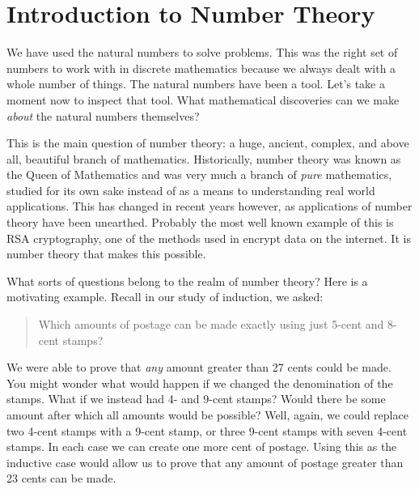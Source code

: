 \documentclass[10pt,]{book}
\theoremstyle{plain}
\theoremstyle{definition}
\theoremstyle{definition}
\theoremstyle{definition}
\numberwithin{equation}{chapter}
\begin{document}
\section[Introduction to Number Theory]{Introduction to Number Theory}\label{section-30}
\typeout{************************************************}
\typeout{************************************************}

We have used the natural numbers to solve problems. This was the right set of numbers to work with in discrete mathematics because we always dealt with a whole number of things. The natural numbers have been a tool. Let's take a moment now to inspect that tool. What mathematical discoveries can we make \emph{about} the natural numbers themselves?
%
\par

This is the main question of number theory: a huge, ancient, complex, and above all, beautiful branch of mathematics. Historically, number theory was known as the Queen of Mathematics and was very much a branch of \emph{pure} mathematics, studied for its own sake instead of as a means to understanding real world applications. This has changed in recent years however, as applications of number theory have been unearthed. Probably the most well known example of this is RSA cryptography, one of the methods used in encrypt data on the internet. It is number theory that makes this possible.
%
\par

What sorts of questions belong to the realm of number theory? Here is a motivating example. Recall in our study of induction, we asked:
%
\begin{quote}
Which amounts of postage can be made exactly using just 5-cent and 8-cent stamps?
\end{quote}
\par

We were able to prove that \emph{any} amount greater than 27 cents could be made. You might wonder what would happen if we changed the denomination of the stamps. What if we instead had 4- and 9-cent stamps? Would there be some amount after which all amounts would be possible? Well, again, we could replace two 4-cent stamps with a 9-cent stamp, or three 9-cent stamps with seven 4-cent stamps. In each case we can create one more cent of postage. Using this as the inductive case would allow us to prove that any amount of postage greater than 23 cents can be made.
%
\par
\end{document}
